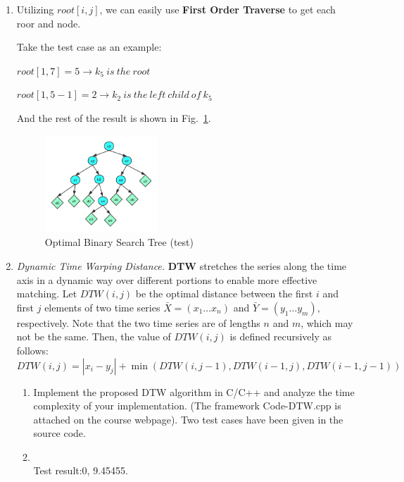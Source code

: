 \documentclass[12pt,a4paper]{article}
\makeatletter
\newtheorem*{solution}{Solution}
\theoremstyle{definition}
\renewenvironment{solution}[1][Solution] {\par\pushQED{\qed}\normalfont\topsep6\p@\@plus6\p@\relax\trivlist\item[\hskip\labelsep\bfseries#1\@addpunct{.}]\ignorespaces}{\popQED\endtrivlist\@endpefalse} \makeatother
\makeatother
\begin{document}
\begin{enumerate}
\begin{solution}
\begin{algorithm}[H]
        	\end{algorithm}
        	
        Utilizing $root[i,j]$, we can easily use \textbf{First Order Traverse} to get each roor and node.
        
        Take the test case as an example:
        
        $root[1,7]=5\rightarrow k_5\ is\ the\ root$
        
        $root[1,5-1]=2 \rightarrow k_2\ is\ the\ left\ child\ of\ k_5$
        
        And the rest of the result is shown in Fig.~\ref{tree5}.
        
	    \begin{figure}[htbp]
                \centering
                \includegraphics[width=0.4\textwidth]{Lab05-YanjieZe/tree5.png}
                \caption{Optimal Binary Search Tree (test)}\label{tree5}
            \end{figure}
	    \end{solution}
		
		\item \textit{Dynamic Time Warping Distance.} \textbf{DTW} stretches the series along the time axis in a dynamic way over different
		portions to enable more effective matching. Let $D T W(i, j)$ be the optimal distance between the first $i$ and first $j$ elements of two time series $\bar{X}=\left(x_{1} \ldots x_{n}\right)$ and $\bar{Y}=\left(y_{1} \ldots y_{m}\right),$ respectively. Note that the two time series are of lengths $n$ and $m$, which may not be the same. Then, the value of $D T W(i, j)$ is defined recursively as follows:
		$$
		DTW(i, j)=\left|x_{i}- y_{j}\right|+\min(DTW(i, j-1), DTW(i-1, j), DTW(i-1, j-1))
		$$
		
		\begin{enumerate}
			\item Implement the proposed DTW algorithm in C/C++ and analyze the time complexity of your implementation. ({\color{blue}The framework Code-DTW.cpp is attached on the course webpage}). Two test cases have been given in the source code. 
			\begin{solution}
			~\\
			Test result:0, 9.45455.
			

\end{solution}
\end{enumerate}
\end{enumerate}
\end{document}
